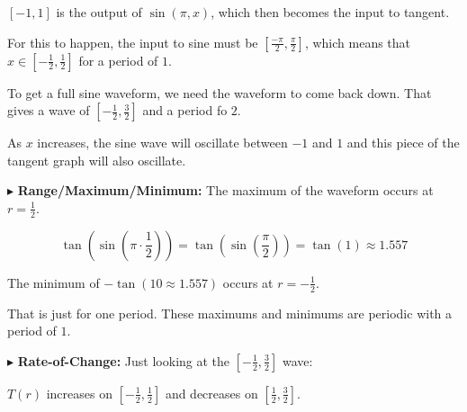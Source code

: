 \documentclass{ximera}
\begin{document}
$[-1,1]$ is the output of $\sin(\pi,x)$, which then becomes the input to tangent.  




For this to happen, the input to sine must be $\left[\frac{-\pi}{2}, \frac{\pi}{2}\right]$, which means that $x \in \left[-\frac{1}{2}, \frac{1}{2}\right]$ for a period of $1$.



To get a full sine waveform, we need the waveform to come back down.  That gives a wave of $\left[-\frac{1}{2}, \frac{3}{2}\right]$ and a period fo $2$.



As $x$ increases, the sine wave will oscillate between $-1$ and $1$ and this piece of the tangent graph will also oscillate.  






\begin{image}
\end{image}




$\blacktriangleright$ \textbf{Range/Maximum/Minimum:} The maximum of the waveform occurs at $r = \frac{1}{2}$.


\[   \tan\left(\sin\left(\pi \cdot \frac{1}{2}\right)\right)  =   \tan\left(\sin\left(\frac{\pi}{2}\right)\right)  = \tan(1)  \approx 1.557  \]


The minimum of $-\tan(10 \approx 1.557)$ occurs at $r = -\frac{1}{2}$.


That is just for one period. These maximums and minimums are periodic with a period of $1$.






$\blacktriangleright$ \textbf{Rate-of-Change:}  Just looking at the $\left[ -\frac{1}{2}, \frac{3}{2} \right]$ wave:

$T(r)$ increases on $\left[ -\frac{1}{2}, \frac{1}{2} \right]$ and decreases on $\left[\frac{1}{2}, \frac{3}{2} \right]$.
\end{document}
